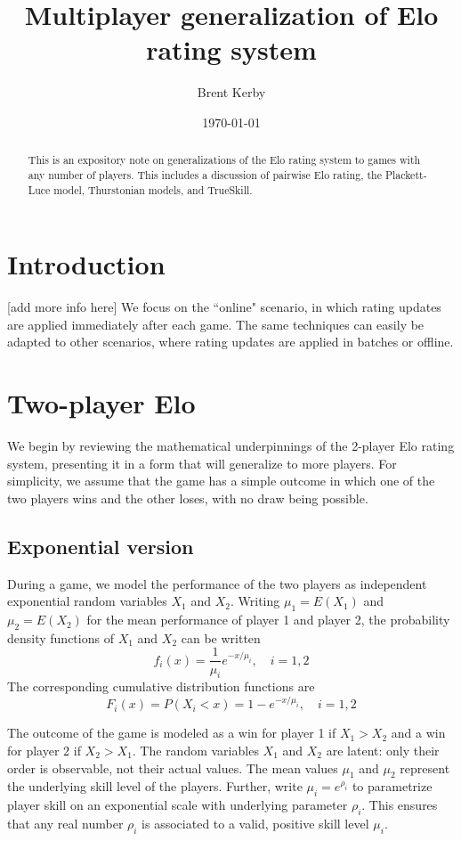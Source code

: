 \documentclass{article}
\title{Multiplayer generalization of Elo rating system}
\date{\today}
\author{Brent Kerby}
\begin{document}
	\maketitle
	\begin{abstract}
		This is an expository note on generalizations of the Elo rating system to games with any number of players. This
		includes a discussion of pairwise Elo rating, the Plackett-Luce model, Thurstonian models, and TrueSkill.
	\end{abstract}
	\section{Introduction}
	[add more info here]
	We focus on the ``online" scenario, in which rating updates are applied immediately after each game. The same techniques can easily be adapted to other scenarios, where rating updates are applied in batches or offline.
	\section{Two-player Elo}
	We begin by reviewing the mathematical underpinnings of the 2-player Elo rating system, presenting it in a form that will generalize to more players. For simplicity, we assume that the game has a simple outcome in which one of the two players wins and the other loses, with no draw being possible.
	
	\subsection{Exponential version}
	During a game, we model the performance of the two players as independent exponential random variables $X_1$ and $X_2$. Writing $\mu_1 = E(X_1)$ and $\mu_2 = E(X_2)$ for the mean performance of player 1 and player 2, the probability density functions of $X_1$ and $X_2$ can be written
	$$f_i(x) = \frac1{\mu_i}e^{-x/\mu_i},\quad i=1, 2$$
	The corresponding cumulative distribution functions are
	$$F_i(x) = P(X_i < x) = 1 - e^{-x/\mu_i},\quad i=1, 2$$
	
	The outcome of the game is modeled as a win for player 1 if $X_1 > X_2$ and a win for player 2 if $X_2 > X_1$. The random variables $X_1$ and $X_2$ are latent: only their order is observable, not their actual values. The mean values $\mu_1$ and $\mu_2$ represent the underlying skill level of the players. Further, write $\mu_i = e^{\rho_i}$ to parametrize player skill on an exponential scale with underlying parameter $\rho_i$. This ensures that any real number $\rho_i$ is associated to a valid, positive skill level $\mu_i$. 
	
\end{document}
